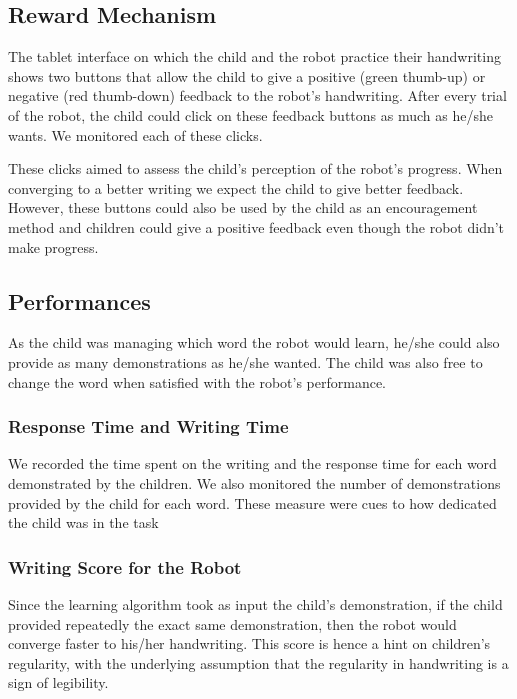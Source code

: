 \documentclass[letterpaper, 10 pt, conference]{ieeeconf}  %
\begin{document}
\vspace{-0.1cm}
\subsection{Reward Mechanism}
\vspace{-0.2cm}
\label{ss:feedback}
The tablet interface on which the child and the robot practice their handwriting shows two buttons that allow the child to give a positive (green thumb-up) or negative (red thumb-down) feedback to the robot's handwriting.
After every trial of the robot, the child could click on these feedback buttons as much as he/she wants.
We monitored each of these clicks.

These clicks aimed to assess the child's perception of the robot's progress.
When converging to a better writing we expect the child to give better feedback.
However, these buttons could also be used by the child as an encouragement method and children could give a positive feedback even though the robot didn't make progress.

\subsection{Performances}
As the child was managing which word the robot would learn, he/she could also provide as many demonstrations as he/she wanted.
The child was also free to change the word when satisfied with the robot's performance.

\subsubsection{Response Time and Writing Time}
We recorded the time spent on the writing and the response time for each word demonstrated by the children.
We also monitored the number of demonstrations provided by the child for each word.
These measure were cues to how dedicated the child was in the task 

\subsubsection{Writing Score for the Robot}
Since the learning algorithm took as input the child's demonstration, if the child provided repeatedly the exact same demonstration, then the robot would converge faster to his/her handwriting.
This score is hence a hint on children's regularity, with the underlying assumption that the regularity in handwriting is a sign of legibility.
\end{document}
